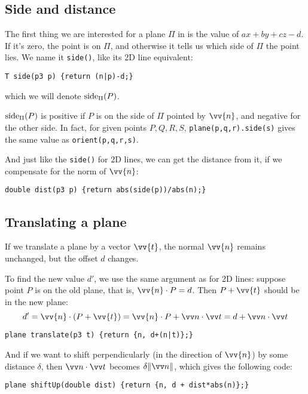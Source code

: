 \subsection{Side and distance}
The first thing we are interested for a plane $\Pi$ in is the value of $ax+by+cz-d$. If it's zero, the point is on $\Pi$, and otherwise it tells us which side of $\Pi$ the point lies. We name it \lstinline|side()|, like its 2D line equivalent:
\begin{lstlisting}
T side(p3 p) {return (n|p)-d;}
\end{lstlisting}
which we will denote $\operatorname{side}_{\Pi}(P)$.

$\operatorname{side}_{\Pi}(P)$ is positive if $P$ is on the side of $\Pi$ pointed by $\vv{n}$, and negative for the other side. In fact, for given points $P,Q,R,S$, \lstinline|plane(p,q,r).side(s)| gives the same value as \lstinline|orient(p,q,r,s)|.


And just like the \lstinline|side()| for 2D lines, we can get the distance from it, if we compensate for the norm of $\vv{n}$:
\begin{lstlisting}
double dist(p3 p) {return abs(side(p))/abs(n);}
\end{lstlisting}

\subsection{Translating a plane}
If we translate a plane by a vector $\vv{t}$, the normal $\vv{n}$ remains unchanged, but the offset $d$ changes.


To find the new value $d'$, we use the same argument as for 2D lines: suppose point $P$ is on the old plane, that is, $\vv{n}\cdot P = d$. Then $P+\vv{t}$ should be in the new plane:
\[d' = \vv{n}\cdot(P+\vv{t}) = \vv{n}\cdot P + \dotv{n}{t} = d + \dotv{n}{t}\]

\begin{lstlisting}
plane translate(p3 t) {return {n, d+(n|t)};}
\end{lstlisting}

And if we want to shift perpendicularly (in the direction of $\vv{n}$) by some distance $\delta$, then $\dotv{n}{t}$ becomes $\delta\normv{n}$, which gives the following code:
\begin{lstlisting}
plane shiftUp(double dist) {return {n, d + dist*abs(n)};}
\end{lstlisting}

